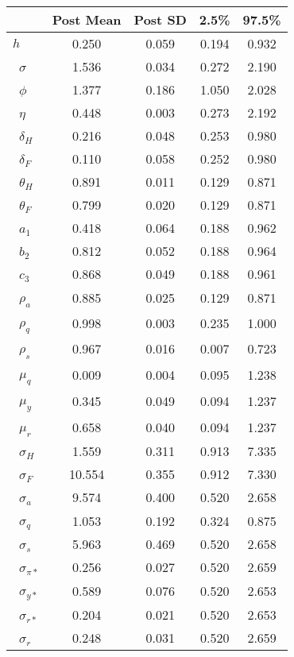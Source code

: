 \begin{tiny}\begin{tabular}{lcccc}
\hline
&\textbf{Post Mean}&\textbf{Post SD}&\textbf{2.5\%}&\textbf{97.5\%}\\\hline
\textbf{$ h             $}&0.250&0.059&0.194&0.932\\\
\textbf{$ \sigma        $}&1.536&0.034&0.272&2.190\\\
\textbf{$ \phi          $}&1.377&0.186&1.050&2.028\\\
\textbf{$ \eta          $}&0.448&0.003&0.273&2.192\\\
\textbf{$ \delta_{H}    $}&0.216&0.048&0.253&0.980\\\
\textbf{$ \delta_{F}    $}&0.110&0.058&0.252&0.980\\\
\textbf{$ \theta_{H}    $}&0.891&0.011&0.129&0.871\\\
\textbf{$ \theta_{F}    $}&0.799&0.020&0.129&0.871\\\
\textbf{$ a_{1}         $}&0.418&0.064&0.188&0.962\\\
\textbf{$ b_{2}         $}&0.812&0.052&0.188&0.964\\\
\textbf{$ c_{3}         $}&0.868&0.049&0.188&0.961\\\
\textbf{$ \rho_{a}      $}&0.885&0.025&0.129&0.871\\\
\textbf{$ \rho_{q}      $}&0.998&0.003&0.235&1.000\\\
\textbf{$ \rho_{s}      $}&0.967&0.016&0.007&0.723\\\
\textbf{$ \mu_{q}       $}&0.009&0.004&0.095&1.238\\\
\textbf{$ \mu_{y}       $}&0.345&0.049&0.094&1.237\\\
\textbf{$ \mu_{r}       $}&0.658&0.040&0.094&1.237\\\
\textbf{$ \sigma_{H}    $}&1.559&0.311&0.913&7.335\\\
\textbf{$ \sigma_{F}    $}&10.554&0.355&0.912&7.330\\\
\textbf{$ \sigma_{a}    $}&9.574&0.400&0.520&2.658\\\
\textbf{$ \sigma_{q}    $}&1.053&0.192&0.324&0.875\\\
\textbf{$ \sigma_{s}    $}&5.963&0.469&0.520&2.658\\\
\textbf{$ \sigma_{\pi*} $}&0.256&0.027&0.520&2.659\\\
\textbf{$ \sigma_{y*}   $}&0.589&0.076&0.520&2.653\\\
\textbf{$ \sigma_{r*}   $}&0.204&0.021&0.520&2.653\\\
\textbf{$ \sigma_{r}    $}&0.248&0.031&0.520&2.659\\\hline
\end{tabular}
\end{tiny}